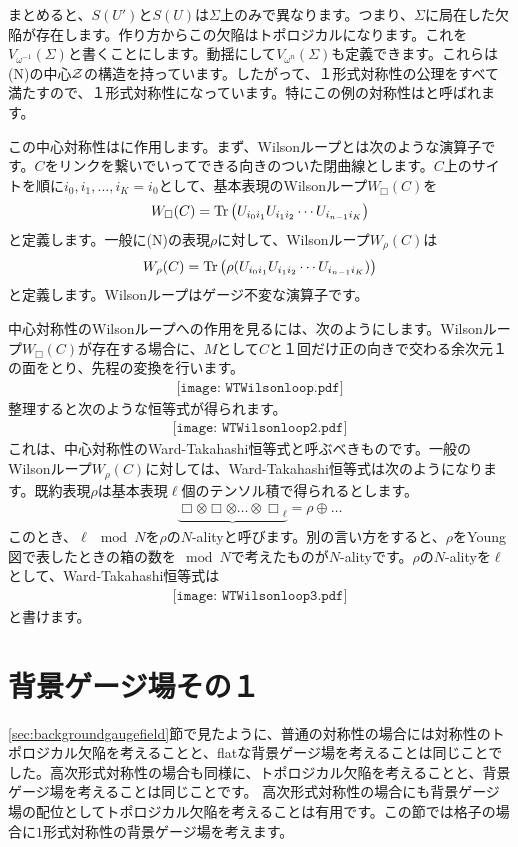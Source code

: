 \documentclass[generalized_symmetry.tex]{subfiles}
\begin{document}
まとめると、$S(U')$と$S(U)$は$\Sigma$上のみで異なります。つまり、$\Sigma$に局在した欠陥が存在します。作り方からこの欠陥はトポロジカルになります。これを$V_{\omega^{-1}}(\Sigma)$と書くことにします。動揺にして$V_{\omega^{n}}(\Sigma)$も定義できます。これらは\SU(N)の中心$\mathcal{Z}$の構造を持っています。したがって、１形式対称性の公理をすべて満たすので、１形式対称性になっています。特にこの例の対称性はと呼ばれます。

この中心対称性はに作用します。まず、Wilsonループとは次のような演算子です。$C$をリンクを繋いでいってできる向きのついた閉曲線とします。$C$上のサイトを順に$i_0,i_1,\dots,i_K=i_0$として、基本表現のWilsonループ$W_{\Box}(C)$を
\begin{align}
    W_{\Box}(C) = \Tr\left( U_{i_0 i_1} U_{i_1 i_2} \cdots U_{i_{n-1} i_K}\right)
\end{align}
と定義します。一般に\SU(N)の表現$\rho$に対して、Wilsonループ$W_{\rho}(C)$は
\begin{align}
    W_{\rho}(C) = \Tr\left( \rho(U_{i_0 i_1} U_{i_1 i_2} \cdots U_{i_{n-1} i_K})\right)
\end{align}
と定義します。Wilsonループはゲージ不変な演算子です。

中心対称性のWilsonループへの作用を見るには、次のようにします。Wilsonループ$W_{\Box}(C)$が存在する場合に、$M$として$C$と１回だけ正の向きで交わる余次元１の面をとり、先程の変換を行います。
\begin{align}
    \texttt{[image: WTWilsonloop.pdf]}
\end{align}
整理すると次のような恒等式が得られます。
\begin{align}
    \texttt{[image: WTWilsonloop2.pdf]}
\end{align}
これは、中心対称性のWard-Takahashi恒等式と呼ぶべきものです。一般のWilsonループ$W_{\rho}(C)$に対しては、Ward-Takahashi恒等式は次のようになります。既約表現$\rho$は基本表現$\ell$個のテンソル積で得られるとします。
\begin{align}
    \underbrace{{
    \Box \otimes \Box \otimes \dots \otimes \Box}_{\ell}} = \rho \oplus \dots
\end{align}
このとき、$\ell \mod{N}$を$\rho$の$N$-alityと呼びます。別の言い方をすると、$\rho$をYoung図で表したときの箱の数を$\mod{N}$で考えたものが$N$-alityです。$\rho$の$N$-alityを$\ell$として、Ward-Takahashi恒等式は
\begin{align}
    \texttt{[image: WTWilsonloop3.pdf]}
\end{align}
と書けます。
\section{背景ゲージ場その１}
\ref{sec:backgroundgaugefield}節で見たように、普通の対称性の場合には対称性のトポロジカル欠陥を考えることと、flatな背景ゲージ場を考えることは同じことでした。高次形式対称性の場合も同様に、トポロジカル欠陥を考えることと、背景ゲージ場を考えることは同じことです。
高次形式対称性の場合にも背景ゲージ場の配位としてトポロジカル欠陥を考えることは有用です。この節では格子の場合に$1$形式対称性の背景ゲージ場を考えます。
\end{document}

